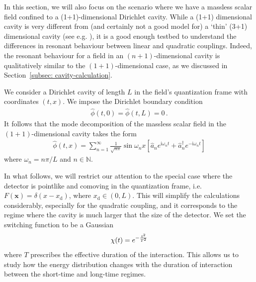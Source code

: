 \documentclass[prd,twocolumn,superscriptaddress,nofootinbib,floatfix,amsmath,amssymb]{revtex4-2}
\newcommand{\ii}{\mathrm{i}}
\newcommand{\bx}{\bm{x}}
\begin{document}
    In this section, we will also focus on the scenario where we have a massless scalar field confined to a (1+1)-dimensional Dirichlet cavity. While a (1+1) dimensional cavity is very different from (and certainly not a good model for) a `thin' (3+1) dimensional cavity (see e.g. \cite{Lopp:2018cavity}), it is a good enough testbed to understand the differences in resonant behaviour between linear and quadratic couplings. Indeed, the resonant behaviour for a field in an $(n+1)$-dimensional cavity is qualitatively similar to the $(1+1)$-dimensional case, as we discussed in Section~\ref{subsec: cavity-calculation}.
    
    We consider a Dirichlet cavity of length $L$ in the field's quantization frame with coordinates $(t,x)$. We impose the Dirichlet boundary condition 
    \begin{align}
        \hat\phi(t,0) = \hat\phi(t,L) = 0\,.    
    \end{align}
    It follows that the mode decomposition of the massless scalar field in  the $(1+1)$-dimensional cavity takes the form
    \begin{align}
        \hat\phi(t,x) = \sum_{n=1}^\infty \frac{1}{\sqrt{n\pi}}\sin\omega_n x\left[\hat a_{n}e^{\ii\omega_n t} + \hat a^\dagger_{n}e^{-\ii\omega_n t}\right]
        \label{eq: mode-decomposition-cavity-1D}
    \end{align}
    where $\omega_n = n\pi /L$ and $n\in \mathbb{N}$. 
    
    In what follows, we will restrict our attention to the special case where the detector is pointlike and comoving in the quantization frame, i.e. $F(\bx)=\delta(x-x_\text{d})$, where $x_\text{d}\in (0,L)$. This will simplify the calculations considerably, especially for the quadratic coupling, and it corresponds to the regime where the cavity is much larger that the size of the detector. We set the switching function to be a Gaussian \begin{equation}
    \chi(t)=e^{-\frac{t^2}{T^2}}\notag
    \end{equation} where $T$ prescribes the effective duration of the interaction. This allows us to study how the energy distribution changes with the duration of interaction between the short-time and long-time regimes.
    
    
    
    
    
    
    
    
    
    
    
\end{document}

